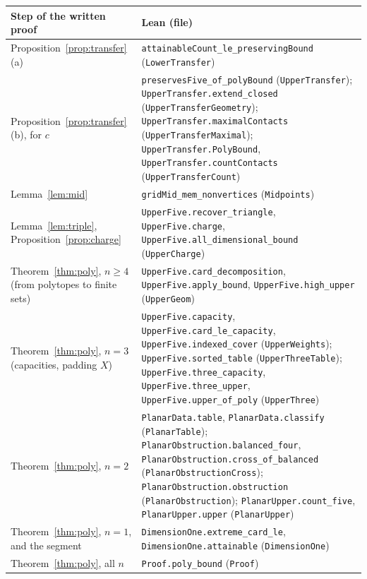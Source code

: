 \documentclass[11pt]{article}
\theoremstyle{definition}
\theoremstyle{remark}
\begin{document}
{\begin{table}[!htbp]
\centering\footnotesize
\renewcommand{\arraystretch}{1.05}
\begin{tabular}{@{}>{\raggedright\arraybackslash}p{}>{\raggedright\arraybackslash}p{}@{}}
\hline
Step of the written proof & Lean (file) \\
\hline
Proposition~\ref{prop:transfer}(a) &
\texttt{attainableCount\_le\_preservingBound} (\texttt{LowerTransfer}) \\
Proposition~\ref{prop:transfer}(b), for $c$ &
\texttt{preservesFive\_of\_polyBound} (\texttt{UpperTransfer});
\texttt{UpperTransfer.extend\_closed} (\texttt{UpperTransferGeometry});
\texttt{UpperTransfer.maximalContacts} (\texttt{UpperTransferMaximal});
\texttt{UpperTransfer.PolyBound}, \texttt{UpperTransfer.countContacts}
(\texttt{UpperTransferCount}) \\
Lemma~\ref{lem:mid} & \texttt{gridMid\_mem\_nonvertices} (\texttt{Midpoints}) \\
Lemma~\ref{lem:triple}, Proposition~\ref{prop:charge} &
\texttt{UpperFive.recover\_triangle}, \texttt{UpperFive.charge},
\texttt{UpperFive.all\_dimensional\_bound}
(\texttt{UpperCharge}) \\
Theorem~\ref{thm:poly}, $n\ge4$ (from polytopes to finite sets) &
\texttt{UpperFive.card\_decomposition}, \texttt{UpperFive.apply\_bound},
\texttt{UpperFive.high\_upper} (\texttt{UpperGeom}) \\
Theorem~\ref{thm:poly}, $n=3$ (capacities, padding $X$) &
\texttt{UpperFive.capacity}, \texttt{UpperFive.card\_le\_capacity},
\texttt{UpperFive.indexed\_cover} (\texttt{UpperWeights});
\texttt{UpperFive.sorted\_table} (\texttt{UpperThreeTable});
\texttt{UpperFive.three\_capacity}, \texttt{UpperFive.three\_upper},
\texttt{UpperFive.upper\_of\_poly} (\texttt{UpperThree}) \\
Theorem~\ref{thm:poly}, $n=2$ &
\texttt{PlanarData.table}, \texttt{PlanarData.classify} (\texttt{PlanarTable});
\texttt{PlanarObstruction.balanced\_four},
\texttt{PlanarObstruction.cross\_of\_balanced} (\texttt{PlanarObstructionCross});
\texttt{PlanarObstruction.obstruction} (\texttt{PlanarObstruction});
\texttt{PlanarUpper.count\_five}, \texttt{PlanarUpper.upper} (\texttt{PlanarUpper}) \\
Theorem~\ref{thm:poly}, $n=1$, and the segment &
\texttt{DimensionOne.extreme\_card\_le}, \texttt{DimensionOne.attainable}
(\texttt{DimensionOne}) \\
Theorem~\ref{thm:poly}, all $n$ & \texttt{Proof.poly\_bound} (\texttt{Proof}) \\

\end{tabular}
\end{table}}
\end{document}
